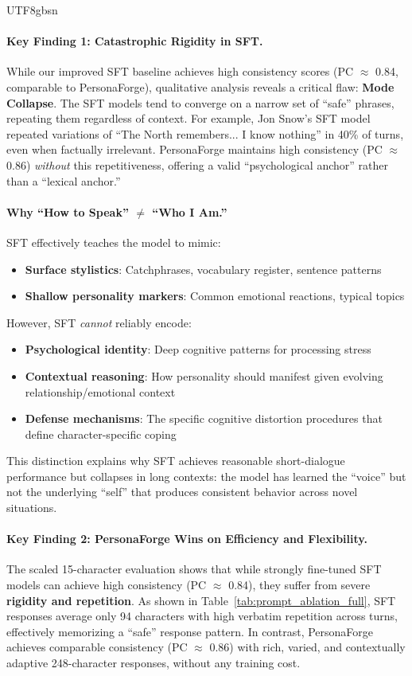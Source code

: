 \documentclass[11pt]{article}
\begin{document}
\begin{CJK*}{UTF8}{gbsn}
\paragraph{Key Finding 1: Catastrophic Rigidity in SFT.} While our improved SFT baseline achieves high consistency scores (PC $\approx$ 0.84, comparable to PersonaForge), qualitative analysis reveals a critical flaw: \textbf{Mode Collapse}. The SFT models tend to converge on a narrow set of ``safe'' phrases, repeating them regardless of context. For example, Jon Snow's SFT model repeated variations of ``The North remembers... I know nothing'' in 40\% of turns, even when factually irrelevant. PersonaForge maintains high consistency (PC $\approx$ 0.86) \textit{without} this repetitiveness, offering a valid ``psychological anchor'' rather than a ``lexical anchor.''

\paragraph{Why ``How to Speak'' $\neq$ ``Who I Am.''} SFT effectively teaches the model to mimic:
\begin{itemize}
    \item \textbf{Surface stylistics}: Catchphrases, vocabulary register, sentence patterns
    \item \textbf{Shallow personality markers}: Common emotional reactions, typical topics
\end{itemize}
However, SFT \textit{cannot} reliably encode:
\begin{itemize}
    \item \textbf{Psychological identity}: Deep cognitive patterns for processing stress
    \item \textbf{Contextual reasoning}: How personality should manifest given evolving relationship/emotional context
    \item \textbf{Defense mechanisms}: The specific cognitive distortion procedures that define character-specific coping
\end{itemize}

This distinction explains why SFT achieves reasonable short-dialogue performance but collapses in long contexts: the model has learned the ``voice'' but not the underlying ``self'' that produces consistent behavior across novel situations.

\paragraph{Key Finding 2: PersonaForge Wins on Efficiency and Flexibility.} The scaled 15-character evaluation shows that while strongly fine-tuned SFT models can achieve high consistency (PC $\approx$ 0.84), they suffer from severe \textbf{rigidity and repetition}. As shown in Table~\ref{tab:prompt_ablation_full}, SFT responses average only 94 characters with high verbatim repetition across turns, effectively memorizing a ``safe'' response pattern. In contrast, PersonaForge achieves comparable consistency (PC $\approx$ 0.86) with rich, varied, and contextually adaptive 248-character responses, without any training cost.


\end{CJK*}
\end{document}
